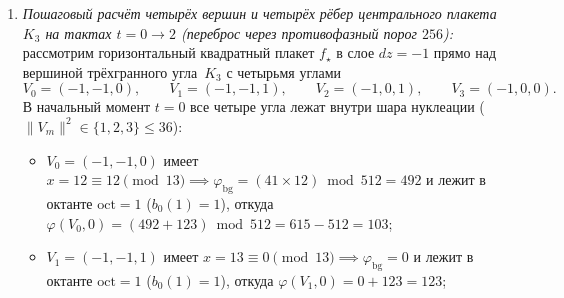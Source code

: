 \begin{corollary}[Единство природы и количества заряда: частное и остаток одного деления на $\phaseRingCount = 512$]
\begin{enumerate}[label=(\roman*)]
\begin{enumerate}[label=(\alph*),nosep]
    \begin{align*}
      \delta\zeta_{\mathrm{real}}(x_+) &= 259\,584 - 134\,862 = 124\,722,\\
      z_{\mathrm{drive}}(x_+) &= +70\,980 + (+1)\times 124\,722 = +195\,702,\\
      D(x_+) &= 134\,862 + 21\,632 + 8\,192 = 164\,686.
    \end{align*}
    Для парного узла $x_-=(-1,2,2)$ по другую сторону стенки все $4$ междоменные разности меняют знак ($\Delta\varphi \in \{-123,-82,-164\}$), поэтому чётная сумма $\zeta_{\mathrm{real}}(x_-)=134\,862$, дефицит $\delta\zeta_{\mathrm{real}}(x_-)=124\,722$ и знаменатель $D(x_-)=164\,686$ остаются теми же самыми, а нечётная сумма $\zeta_{\mathrm{imag}}(x_-)=-70\,980$ и числитель $z_{\mathrm{drive}}(x_-) = -70\,980 + (-1)\times 124\,722 = -195\,702$ меняют знак на противоположный.
    Умножая числитель на $K_P=64$ ($64\times 195\,702 = 12\,524\,928$) и деля с остатком на $D = 164\,686$:
    \[
      12\,524\,928 \;=\; 76\times 164\,686 + 8\,792,
      \qquad
      -12\,524\,928 \;=\; (-77)\times 164\,686 + 155\,894,
    \]
    получаем по определению целой части $\lfloor u\rfloor$:
    \[
      \Phi(z=0^+,0) = \left\lfloor \frac{+12\,524\,928}{164\,686} \right\rfloor = +76,
      \qquad
      \Phi(z=-1^-,0) = \left\lfloor \frac{-12\,524\,928}{164\,686} \right\rfloor = -77.
    \]
    Поскольку остаток деления $8\,792$ не равен нулю, округление вниз положительной и отрицательной дробей даёт неустранимую целочисленную асимметрию $\Phi(z=0^+,0) + \Phi(z=-1^-,0) = 76 + (-77) = -1$ тик уже на первом такте.
  \item \emph{Пошаговый расчёт четырёх вершин и четырёх рёбер центрального плакета $K_3$ на тактах $t=0\to 2$ (переброс через противофазный порог $256$):}
    рассмотрим горизонтальный квадратный плакет $f_\star$ в слое $dz=-1$ прямо над вершиной трёхгранного угла~$K_3$ с четырьмя углами
    \[
      V_0 = (-1,-1,0),\qquad V_1 = (-1,-1,1),\qquad V_2 = (-1,0,1),\qquad V_3 = (-1,0,0).
    \]
    В начальный момент $t=0$ все четыре угла лежат внутри шара нуклеации ($\|V_m\|^2 \in \{1,2,3\} \le 36$):
    \begin{itemize}[nosep,leftmargin=*]
    \item $V_0=(-1,-1,0)$ имеет $x=12 \equiv 12\pmod{13} \implies \varphi_{\mathrm{bg}} = (41\times 12)\bmod 512 = 492$ и лежит в октанте $\mathrm{oct}=1$ ($b_0(1)=1$), откуда $\varphi(V_0,0) = (492 + 123)\bmod 512 = 615 - 512 = 103$;
    \item $V_1=(-1,-1,1)$ имеет $x=13 \equiv 0\pmod{13} \implies \varphi_{\mathrm{bg}} = 0$ и лежит в октанте $\mathrm{oct}=1$ ($b_0(1)=1$), откуда $\varphi(V_1,0) = 0 + 123 = 123$;

\end{itemize}
\end{enumerate}
\end{enumerate}
\end{corollary}
